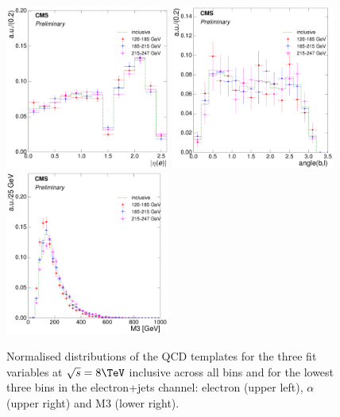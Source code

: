 \begin{figure}[hbtp]
    \centering
     \includegraphics[width=0.48\textwidth]{Chapters/04_Analysis/04b_XSections/images/8TeV/fit_variables/electron/HT/electron_absolute_eta/qcd/HT_electron_absolute_eta_0orMoreBtag_QCD_template_comparison.pdf}\hfill
     \includegraphics[width=0.48\textwidth]{Chapters/04_Analysis/04b_XSections/images/8TeV/fit_variables/electron/HT/angle_bl/qcd/HT_angle_bl_1orMoreBtag_QCD_template_comparison.pdf}\\
     \includegraphics[width=0.48\textwidth]{Chapters/04_Analysis/04b_XSections/images/8TeV/fit_variables/electron/HT/M3/qcd/HT_M3_0orMoreBtag_QCD_template_comparison.pdf}\\
	 \caption{Normalised distributions of the QCD templates for the three fit variables at $\sqrt{s}=8\TeV$
	 inclusive across all \HT bins and for the lowest three \HT bins in the electron+jets channel: electron
	 \abseta (upper left), $\alpha$ (upper right) and M3 (lower right).}
     \label{fig:HT_fit_variable_qcd_comparisons_electron_8TeV}
\end{figure}

